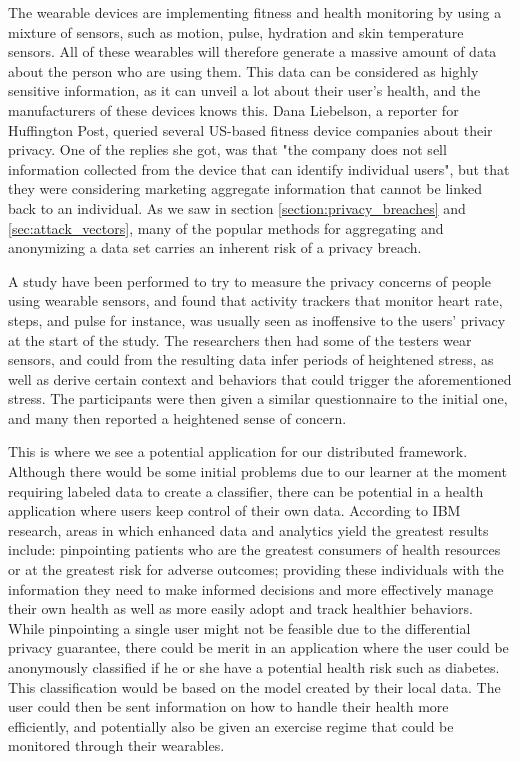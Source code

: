 The wearable devices are implementing fitness and health monitoring by using a mixture of sensors, such as motion, pulse, hydration and skin temperature sensors. All of these wearables will therefore generate a massive amount of data about the person who are using them. This data can be considered as highly sensitive information, as it can unveil a lot about their user's health, and the manufacturers of these devices knows this. Dana Liebelson, a reporter for Huffington Post, queried several US-based fitness device companies about their privacy. One of the replies she got, was that "the company does not sell information collected from the device that can identify individual users", but that they were considering marketing aggregate information that cannot be linked back to an individual\citep{liebelson2014wearables}. As we saw in section \ref{section:privacy_breaches} and \ref{sec:attack_vectors}, many of the popular methods for aggregating and anonymizing a data set carries an inherent risk of a privacy breach.

A study \citep{raij2011privacyConcernWearables} have been performed to try to measure the privacy concerns of people using wearable sensors, and found that activity trackers that monitor heart rate, steps, and pulse for instance, was usually seen as inoffensive to the users’ privacy at the start of the study. The researchers then had some of the testers wear sensors, and could from the resulting data infer periods of heightened stress, as well as derive certain context and behaviors that could trigger the aforementioned stress. The participants were then given a similar questionnaire to the initial one, and many then reported a heightened sense of concern. 
  
This is where we see a potential application for our distributed framework. Although there would be some initial problems due to our learner at the moment requiring labeled data to create a classifier, there can be potential in a health application where users keep control of their own data. According to IBM research, areas in which enhanced data and analytics yield the greatest results include: pinpointing patients who are the greatest consumers of health resources or at the greatest risk for adverse outcomes; providing these individuals with the information they need to make informed decisions and more effectively manage their own health as well as more easily adopt and track healthier behaviors\citep{IBM2013reportBigDataHealth}. While pinpointing a single user might not be feasible due to the differential privacy guarantee, there could be merit in an application where the user could be anonymously classified if he or she have a potential health risk such as diabetes. This classification would be based on the model created by their local data. The user could then be sent information on how to handle their health more efficiently, and potentially also be given an exercise regime that could be monitored through their wearables. 

